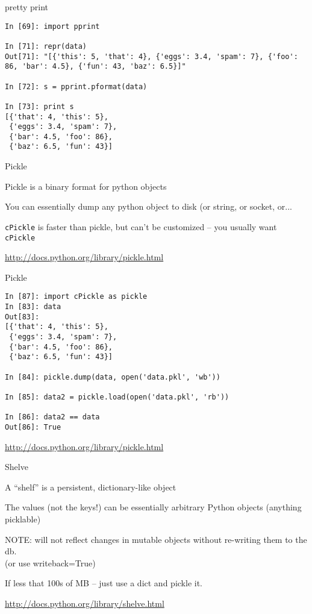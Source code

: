 \documentclass{beamer}
\begin{document}
\begin{frame}[fragile]{pretty print}

{\small
\begin{verbatim}
In [69]: import pprint

In [71]: repr(data)
Out[71]: "[{'this': 5, 'that': 4}, {'eggs': 3.4, 'spam': 7}, {'foo': 86, 'bar': 4.5}, {'fun': 43, 'baz': 6.5}]"

In [72]: s = pprint.pformat(data)

In [73]: print s
[{'that': 4, 'this': 5},
 {'eggs': 3.4, 'spam': 7},
 {'bar': 4.5, 'foo': 86},
 {'baz': 6.5, 'fun': 43}]
\end{verbatim}
}
\end{frame} 

\begin{frame}[fragile]{Pickle}

\vfill
{\Large Pickle is a binary format for python objects}

\vfill
{\Large You can essentially dump any python object to disk (or string, or socket, or...}

\vfill
{\Large \verb|cPickle| is faster than pickle, but
can't be customized -- you usually want \verb|cPickle|} 

\vfill
\url{http://docs.python.org/library/pickle.html}
\end{frame} 


\begin{frame}[fragile]{Pickle}

{\small
\begin{verbatim}
In [87]: import cPickle as pickle
In [83]: data
Out[83]: 
[{'that': 4, 'this': 5},
 {'eggs': 3.4, 'spam': 7},
 {'bar': 4.5, 'foo': 86},
 {'baz': 6.5, 'fun': 43}]

In [84]: pickle.dump(data, open('data.pkl', 'wb'))

In [85]: data2 = pickle.load(open('data.pkl', 'rb'))

In [86]: data2 == data
Out[86]: True
\end{verbatim}
}

\vfill
\url{http://docs.python.org/library/pickle.html}
\end{frame} 

\begin{frame}[fragile]{Shelve}

\vfill
{\Large A ``shelf'' is a persistent, dictionary-like object}

\vfill
{\Large The values (not the keys!) can be essentially arbitrary Python
objects (anything picklable)}

\vfill
{\Large NOTE: will not reflect changes in mutable objects without
   re-writing them to the db.}\\
   (or use writeback=True)

\vfill
{\Large If less that 100s of MB -- just use a dict and pickle it.}

\vfill
\url{http://docs.python.org/library/shelve.html}
\end{frame} 
\end{document}
